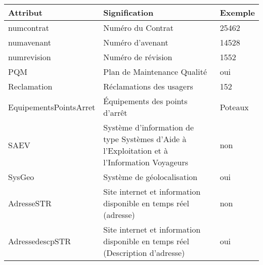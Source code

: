 	\begin{table}[H]
		\begin{center}
			\begin{tabularx}{17.5cm}{|p{4cm}|X|p{2.5cm}|}
				\hline
				\textbf{Attribut}         & \textbf{Signification}                                                                                        & \textbf{Exemple} \\
				\hline
				numcontrat                & Numéro du Contrat                                                                                             & 25462            \\
				\hline
				numavenant                & Numéro d'avenant                                                                                              & 14528            \\
				\hline
				numrevision               & Numéro de révision                                                                                            & 1552             \\
				\hline
				PQM                       & Plan de Maintenance Qualité                                                                                   & oui              \\
				\hline
				Reclamation               & Réclamations des usagers                                                                                      & 152              \\
				\hline
				EquipementsPointsArret    & Équipements des points d'arrêt                                                                                & Poteaux          \\
				\hline
				SAEV                      & Système d'information de type Systèmes d'Aide à l'Exploitation et
				à l'Information Voyageurs & non                                                                                                                              \\
				\hline
				SysGeo                    & Système de géolocalisation                                                                                    & oui              \\
				\hline
				AdresseSTR                & Site internet et information disponible en temps réel (adresse)                                               & non              \\
				\hline
				AdressedescpSTR           & Site internet et information disponible  en temps réel (Description d'adresse)                                & oui              \\

\end{tabularx}
\end{center}
\end{table}
